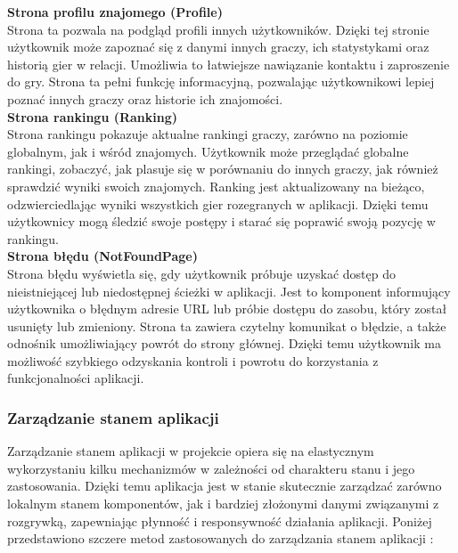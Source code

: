 \documentclass[twoside]{projektInzynierskiMS1}
\begin{document}
\noindent \textbf{Strona profilu znajomego (Profile)}\\
Strona ta pozwala na podgląd profili innych użytkowników. Dzięki tej stronie użytkownik może zapoznać się z danymi innych graczy, ich statystykami oraz historią gier w relacji. Umożliwia to łatwiejsze nawiązanie kontaktu i zaproszenie do gry. Strona ta pełni funkcję informacyjną, pozwalając użytkownikowi lepiej poznać innych graczy oraz historie ich znajomości.
\\

\noindent \textbf{Strona rankingu (Ranking)}\\
Strona rankingu pokazuje aktualne rankingi graczy, zarówno na poziomie globalnym, jak i wśród znajomych. Użytkownik może przeglądać globalne rankingi, zobaczyć, jak plasuje się w porównaniu do innych graczy, jak również sprawdzić wyniki swoich znajomych. Ranking jest aktualizowany na bieżąco, odzwierciedlając wyniki wszystkich gier rozegranych w aplikacji. Dzięki temu użytkownicy mogą śledzić swoje postępy i starać się poprawić swoją pozycję w rankingu.
\\

\noindent \textbf{Strona błędu (NotFoundPage)}\\
Strona błędu wyświetla się, gdy użytkownik próbuje uzyskać dostęp do nieistniejącej lub niedostępnej ścieżki w aplikacji. Jest to komponent informujący użytkownika o błędnym adresie URL lub próbie dostępu do zasobu, który został usunięty lub zmieniony. Strona ta zawiera czytelny komunikat o błędzie, a także odnośnik umożliwiający powrót do strony głównej. Dzięki temu użytkownik ma możliwość szybkiego odzyskania kontroli i powrotu do korzystania z funkcjonalności aplikacji.

\newpage

\subsubsection{Zarządzanie stanem aplikacji}

\noindent
Zarządzanie stanem aplikacji w projekcie opiera się na elastycznym wykorzystaniu kilku mechanizmów w zależności od charakteru stanu i jego zastosowania. Dzięki temu aplikacja jest w stanie skutecznie zarządzać zarówno lokalnym stanem komponentów, jak i bardziej złożonymi danymi związanymi z rozgrywką, zapewniając płynność i responsywność działania aplikacji. Poniżej przedstawiono szczere metod zastosowanych do zarządzania stanem aplikacji \cite{ReactKsiazka}:  
\end{document}
